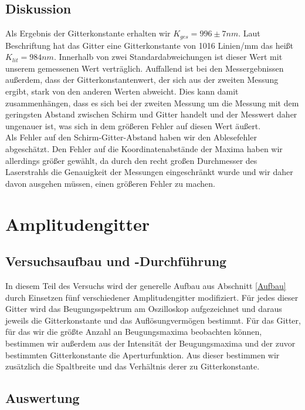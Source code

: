 \documentclass[12pt]{article}
\begin{document}
\newpage
\subsection{Diskussion}

Als Ergebnis der Gitterkonstante erhalten wir $K_{ges} = 996 \pm 7 nm$. Laut Beschriftung hat das Gitter eine Gitterkonstante von 1016 Linien/mm das heißt $K_{lit} = 984 nm$. Innerhalb von zwei Standardabweichungen ist dieser Wert mit unserem gemessenen Wert verträglich. Auffallend ist bei den Messergebnissen außerdem, dass der Gitterkonstantenwert, der sich aus der zweiten Messung ergibt, stark von den anderen Werten abweicht. Dies kann damit zusammenhängen, dass es sich bei der zweiten Messung um die Messung mit dem geringsten Abstand zwischen Schirm und Gitter handelt und der Messwert daher ungenauer ist, was sich in dem größeren Fehler auf diesen Wert äußert. \\

Als Fehler auf den Schirm-Gitter-Abstand haben wir den Ablesefehler abgeschätzt. Den Fehler auf die Koordinatenabstände der Maxima haben wir allerdings größer gewählt, da durch den recht großen Durchmesser des Laserstrahls die Genauigkeit der Messungen eingeschränkt wurde und wir daher davon ausgehen müssen, einen größeren Fehler zu machen.



\newpage
\section{Amplitudengitter}


\subsection{Versuchsaufbau und -Durchführung}

In diesem Teil des Versuchs wird der generelle Aufbau aus Abschnitt \ref{Aufbau} durch Einsetzen fünf verschiedener Amplitudengitter modifiziert. Für jedes dieser Gitter wird das Beugungsspektrum am Oszilloskop aufgezeichnet und daraus jeweils die Gitterkonstante und das Auflösungvermögen bestimmt. Für das Gitter, für das wir die größte Anzahl an Beugungsmaxima beobachten können, bestimmen wir außerdem aus der Intensität der Beugungsmaxima und der zuvor bestimmten Gitterkonstante  die Aperturfunktion. Aus dieser bestimmen wir zusätzlich die Spaltbreite und das Verhältnis derer zu Gitterkonstante.


\subsection{Auswertung}
\end{document}
